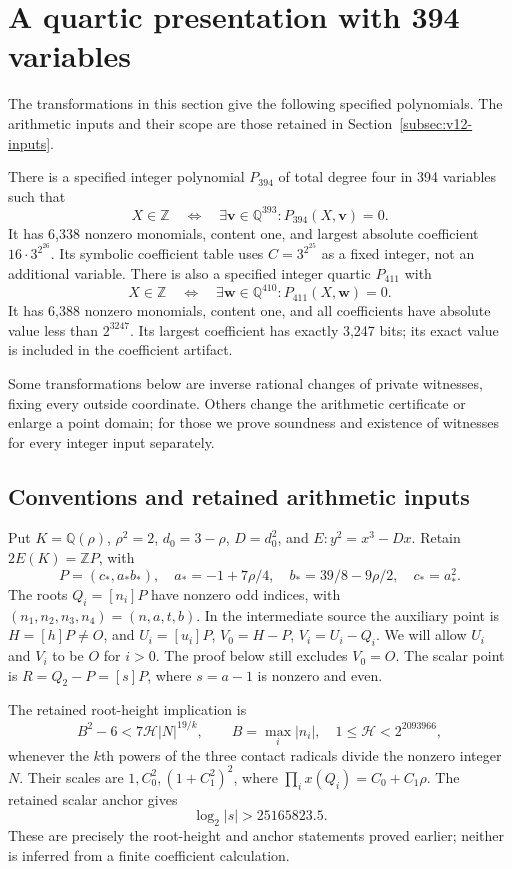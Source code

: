 \section{A quartic presentation with 394 variables}
\label{sec:v13}

The transformations in this section give the following specified
polynomials. The arithmetic inputs and their scope are those retained
in Section~\ref{subsec:v12-inputs}.
\begin{theorem}\label{thm:v13-quartic}
There is a specified integer polynomial $P_{394}$ of total degree four
in 394 variables such that
\[
 X\in\mathbb Z\quad\Longleftrightarrow\quad
 \exists\mathbf v\in\mathbb Q^{393}:P_{394}(X,\mathbf v)=0.
\]
It has 6,338 nonzero monomials, content one, and largest absolute
coefficient $16\cdot3^{2^{26}}$. Its symbolic coefficient table uses
$C=3^{2^{25}}$ as a fixed integer, not an additional variable.
There is also a specified integer quartic $P_{411}$ with
\[
 X\in\mathbb Z\quad\Longleftrightarrow\quad
 \exists\mathbf w\in\mathbb Q^{410}:P_{411}(X,\mathbf w)=0.
\]
It has 6,388 nonzero monomials, content one, and all coefficients have
absolute value less than $2^{3247}$. Its largest coefficient has exactly
3,247 bits; its exact value is included in the coefficient artifact.
\end{theorem}

Some transformations below are inverse rational changes of private
witnesses, fixing every outside coordinate. Others change the arithmetic
certificate or enlarge a point domain; for those we prove soundness and
existence of witnesses for every integer input separately.

\subsection{Conventions and retained arithmetic inputs}
Put $K=\mathbb Q(\rho)$, $\rho^2=2$, $d_0=3-\rho$, $D=d_0^2$, and
$E:y^2=x^3-Dx$. Retain $2E(K)=\mathbb ZP$, with
\[
 P=(c_*,a_*b_*),\quad a_*=-1+7\rho/4,\quad
 b_*=39/8-9\rho/2,\quad c_*=a_*^2.
\]
The roots $Q_i=[n_i]P$ have nonzero odd indices, with
$(n_1,n_2,n_3,n_4)=(n,a,t,b)$. In the intermediate source the auxiliary point is
$H=[h]P\ne O$, and $U_i=[u_i]P$, $V_0=H-P$, $V_i=U_i-Q_i$.
We will allow $U_i$ and $V_i$ to be $O$ for $i>0$. The proof below
still excludes $V_0=O$. The scalar point is $R=Q_2-P=[s]P$, where
$s=a-1$ is nonzero and even.

The retained root-height implication is
\begin{equation}\label{eq:v13-height}
 B^2-6<7\mathcal H|N|^{19/k},\qquad
 B=\max_i|n_i|,\quad 1\le\mathcal H<2^{2093966},
\end{equation}
whenever the $k$th powers of the three contact radicals divide the
nonzero integer $N$. Their scales are $1,C_0^2,(1+C_1^2)^2$, where
$\prod_i x(Q_i)=C_0+C_1\rho$. The retained scalar anchor gives
\begin{equation}\label{eq:v13-anchor}
 \log_2|s|>25165823.5.
\end{equation}
These are precisely the root-height and anchor statements proved earlier;
neither is inferred from a finite coefficient calculation.

